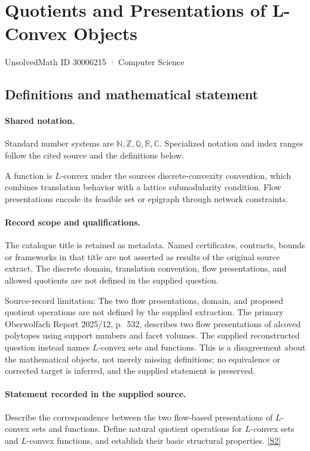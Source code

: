 \documentclass[11pt]{article}
\newcommand{\sref}[2]{\hyperlink{source:#1:#2}{[S#2]}}
\begin{document}
\setcounter{section}{30006214}
\section{Quotients and Presentations of L-Convex Objects}\label{30006215}
{\small\sffamily UnsolvedMath ID 30006215 · Computer Science}
\subsection{Definitions and mathematical statement}

\paragraph{Shared notation.}Standard number systems are $\mathbb N,\mathbb Z,\mathbb Q,\mathbb R,\mathbb C$. Specialized notation and index ranges follow the cited source and the definitions below.


A function is $L$-convex under the source\textquotesingle s discrete-convexity convention, which combines translation behavior with a lattice submodularity condition. Flow presentations encode its feasible set or epigraph through network constraints.
\paragraph{Record scope and qualifications.}
The catalogue title is retained as metadata. Named certificates, contracts, bounds or frameworks in that title are not asserted as results of the original source extract.
The discrete domain, translation convention, flow presentations, and allowed quotients are not defined in the supplied question.

Source-record limitation: The two flow presentations, domain, and proposed quotient operations are not defined by the supplied extraction. The primary Oberwolfach Report 2025/12, p.\ 532, describes two flow presentations of alcoved polytopes using support numbers and facet volumes. The supplied reconstructed question instead names $L$-convex sets and functions. This is a disagreement about the mathematical objects, not merely missing definitions; no equivalence or corrected target is inferred, and the supplied statement is preserved.
\paragraph{Statement recorded in the supplied source.}
Describe the correspondence between the two flow-based presentations of $L$-convex sets and functions. Define natural quotient operations for $L$-convex sets and $L$-convex functions, and establish their basic structural properties. \sref{30006215}{2}
\end{document}
